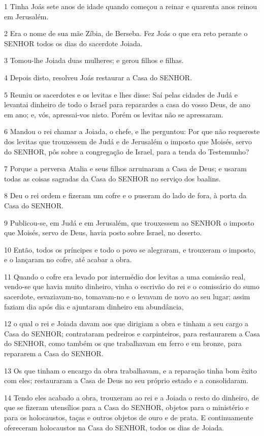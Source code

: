 \par 1 Tinha Joás sete anos de idade quando começou a reinar e quarenta anos reinou em Jerusalém.
\par 2 Era o nome de sua mãe Zíbia, de Berseba. Fez Joás o que era reto perante o SENHOR todos os dias do sacerdote Joiada.
\par 3 Tomou-lhe Joiada duas mulheres; e gerou filhos e filhas.
\par 4 Depois disto, resolveu Joás restaurar a Casa do SENHOR.
\par 5 Reuniu os sacerdotes e os levitas e lhes disse: Saí pelas cidades de Judá e levantai dinheiro de todo o Israel para reparardes a casa do vosso Deus, de ano em ano; e, vós, apressai-vos nisto. Porém os levitas não se apressaram.
\par 6 Mandou o rei chamar a Joiada, o chefe, e lhe perguntou: Por que não requereste dos levitas que trouxessem de Judá e de Jerusalém o imposto que Moisés, servo do SENHOR, pôs sobre a congregação de Israel, para a tenda do Testemunho?
\par 7 Porque a perversa Atalia e seus filhos arruinaram a Casa de Deus; e usaram todas as coisas sagradas da Casa do SENHOR no serviço dos baalins.
\par 8 Deu o rei ordem e fizeram um cofre e o puseram do lado de fora, à porta da Casa do SENHOR.
\par 9 Publicou-se, em Judá e em Jerusalém, que trouxessem ao SENHOR o imposto que Moisés, servo de Deus, havia posto sobre Israel, no deserto.
\par 10 Então, todos os príncipes e todo o povo se alegraram, e trouxeram o imposto, e o lançaram no cofre, até acabar a obra.
\par 11 Quando o cofre era levado por intermédio dos levitas a uma comissão real, vendo-se que havia muito dinheiro, vinha o escrivão do rei e o comissário do sumo sacerdote, esvaziavam-no, tomavam-no e o levavam de novo ao seu lugar; assim faziam dia após dia e ajuntaram dinheiro em abundância,
\par 12 o qual o rei e Joiada davam aos que dirigiam a obra e tinham a seu cargo a Casa do SENHOR; contrataram pedreiros e carpinteiros, para restaurarem a Casa do SENHOR, como também os que trabalhavam em ferro e em bronze, para repararem a Casa do SENHOR.
\par 13 Os que tinham o encargo da obra trabalhavam, e a reparação tinha bom êxito com eles; restauraram a Casa de Deus no seu próprio estado e a consolidaram.
\par 14 Tendo eles acabado a obra, trouxeram ao rei e a Joiada o resto do dinheiro, de que se fizeram utensílios para a Casa do SENHOR, objetos para o ministério e para os holocaustos, taças e outros objetos de ouro e de prata. E continuamente ofereceram holocaustos na Casa do SENHOR, todos os dias de Joiada.
